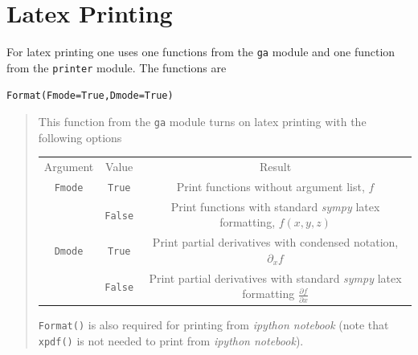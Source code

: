\documentclass[12pt]{report}
\newcommand{\lp}{\left (}
\newcommand{\rp}{\right )}
\newcommand{\f}[2]{{#1}\lp {#2} \rp}
\newcommand{\T}[1]{\texttt{#1}}
\begin{document}
\section{Latex Printing}\label{LatexPrinting}

For latex printing one uses one functions from the \T{ga} module and one
function from the \T{printer} module.  The
functions are

\T{Format(Fmode=True,Dmode=True)}
\begin{quote}
   This function from the \T{ga} module turns on latex printing with the
   following options

\begin{tabular}{ccc}
         Argument &  Value &  Result \\
         \T{Fmode} &  \T{True} &  Print functions without argument list, $f$ \\
               &  \T{False} &  Print functions with standard \emph{sympy} latex formatting, $\f{f}{x,y,z}$ \\
         \T{Dmode} &  \T{True} &  Print partial derivatives with condensed notation, $\partial_{x}f$ \\
               &  \T{False} &  Print partial derivatives with standard \emph{sympy} latex formatting $\frac{\partial f}{\partial x}$ \\
\end{tabular}

	\T{Format()} is also required for printing from \emph{ipython notebook} (note that \T{xpdf()} is not needed to print from \emph{ipython notebook}).
\end{quote}
\end{document}
